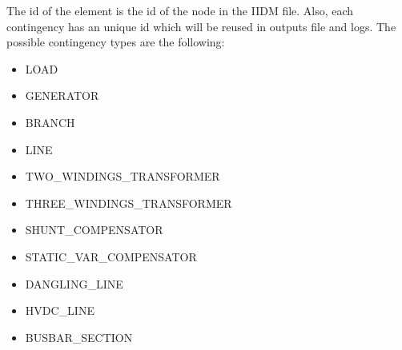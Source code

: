\documentclass[a4paper, 12pt]{report}
\begin{document}
The id of the element is the id of the node in the IIDM file.
Also, each contingency has an unique id which will be reused in outputs file and logs.
The possible contingency types are the following:
\begin{itemize}
  \item LOAD
  \item GENERATOR
  \item BRANCH
  \item LINE
  \item TWO\_WINDINGS\_TRANSFORMER
  \item THREE\_WINDINGS\_TRANSFORMER
  \item SHUNT\_COMPENSATOR
  \item STATIC\_VAR\_COMPENSATOR
  \item DANGLING\_LINE
  \item HVDC\_LINE
  \item BUSBAR\_SECTION
\end{itemize}
\end{document}

